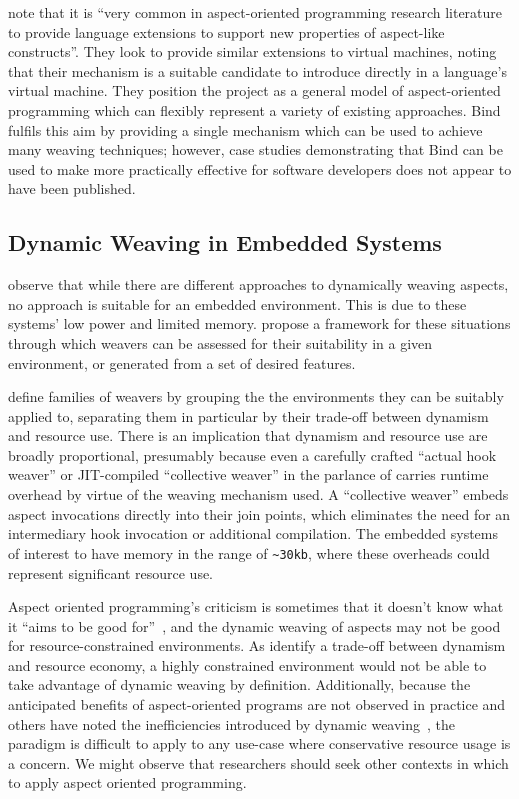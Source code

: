 \citeauthor{rajan2006nu_towardsao_invocation} note that it is ``very common in
aspect-oriented programming research literature to provide language extensions
to support new properties of aspect-like constructs''. They look to provide
similar extensions to virtual machines, noting that their mechanism is a
suitable candidate to introduce \aspectorientation{} directly in a language's
virtual machine. They position the project as a general model of aspect-oriented
programming which can flexibly represent a variety of existing approaches. Bind
fulfils this aim by providing a single mechanism which can be used to achieve
many weaving techniques; however, case studies demonstrating that Bind can be
used to make \aspectorientation{} more practically effective for software
developers does not appear to have been published.


\subsection{Dynamic Weaving in Embedded Systems}

\citet{gilani2004family} observe that while there are different approaches
to dynamically weaving aspects, no approach is suitable for an embedded
environment. This is due to these systems' low power and
limited memory. \citeauthor{gilani2004family} propose a framework for these
situations through which weavers can be assessed for their suitability in a
given environment, or generated from a set of desired features.

\citeauthor{gilani2004family} define families of weavers by grouping the the
environments they can be suitably applied to, separating them in particular by
their trade-off between dynamism and resource use. There is an implication that
dynamism and resource use are broadly proportional, presumably because even a
carefully crafted ``actual hook weaver'' or JIT-compiled ``collective weaver''
in the parlance of \citet{dynamicAOchitchyan} carries runtime overhead by virtue
of the weaving mechanism used. A ``collective weaver'' embeds aspect invocations
directly into their join points, which eliminates the need for an intermediary
hook invocation or additional compilation. The embedded systems of interest to
\citeauthor{gilani2004family} have memory in the range of \lstinline{~30kb},
where these overheads could represent significant resource use.

Aspect oriented programming's criticism is sometimes that it doesn't know what
it ``aims to be good for''~\cite{steimann06paradoxical}, and the dynamic weaving
of aspects may not be good for resource-constrained environments. As
\citeauthor{gilani2004family} identify a trade-off between dynamism and resource
economy, a highly constrained environment would not be able to take advantage of
dynamic weaving by definition. Additionally, because the anticipated benefits of
aspect-oriented programs are not observed in practice and others have noted the
inefficiencies introduced by dynamic
weaving~\cite{dyerNUmasters,dynamicAOchitchyan}, the paradigm is difficult to
apply to any use-case where conservative resource usage is a concern. We might
observe that researchers should seek other contexts in which to apply aspect
oriented programming.

